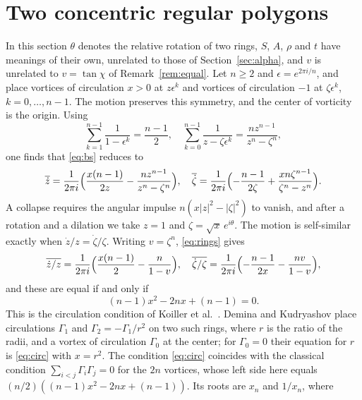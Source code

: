 \documentclass[11pt]{article}
\theoremstyle{definition}
\begin{document}
\section{Two concentric regular polygons}\label{sec:rings}

In this section $\theta$ denotes the relative rotation of two rings, $S$, $A$, $\rho$ and $t$ have meanings of their own, unrelated to those of Section~\ref{sec:alpha}, and $v$ is unrelated to $v = \tan\chi$ of Remark~\ref{rem:equal}. Let $n \ge 2$ and $\epsilon = e^{2\pi i/n}$, and place vortices of circulation $x > 0$ at $z\epsilon^k$ and vortices of circulation $-1$ at $\zeta\epsilon^k$, $k = 0, \dots, n - 1$. The motion preserves this symmetry, and the center of vorticity is the origin. Using
\[
  \sum_{k=1}^{n-1} \frac{1}{1 - \epsilon^k} = \frac{n - 1}{2}, \quad
  \sum_{k=0}^{n-1} \frac{1}{z - \zeta\epsilon^k} = \frac{n z^{n-1}}{z^n - \zeta^n},
\]
one finds that \eqref{eq:bs} reduces to \cite[Eq.~(3)]{aref1982}
\begin{equation}\label{eq:rings}
  \overline{\dot z} = \frac{1}{2\pi i}\Bigl(\frac{x(n - 1)}{2z} - \frac{n z^{n-1}}{z^n - \zeta^n}\Bigr), \quad
  \overline{\dot\zeta} = \frac{1}{2\pi i}\Bigl(-\frac{n - 1}{2\zeta} + \frac{x n \zeta^{n-1}}{\zeta^n - z^n}\Bigr).
\end{equation}
A collapse requires the angular impulse $n(x|z|^2 - |\zeta|^2)$ to vanish, and after a rotation and a dilation we take $z = 1$ and $\zeta = \sqrt{x}\, e^{i\theta}$. The motion is self-similar exactly when $\dot z/z = \dot\zeta/\zeta$. Writing $v = \zeta^n$, \eqref{eq:rings} gives
\[
  \overline{\dot z/z} = \frac{1}{2\pi i}\Bigl(\frac{x(n - 1)}{2} - \frac{n}{1 - v}\Bigr), \quad
  \overline{\dot\zeta/\zeta} = \frac{1}{2\pi i}\Bigl(-\frac{n - 1}{2x} - \frac{n v}{1 - v}\Bigr),
\]
and these are equal if and only if
\begin{equation}\label{eq:circ}
  (n - 1)x^2 - 2nx + (n - 1) = 0.
\end{equation}
This is the circulation condition of Koiller et al.\ \cite[Sect.~11]{koiller1985}. Demina and Kudryashov \cite[Sect.~3]{dk2014} place circulations $\Gamma_1$ and $\Gamma_2 = -\Gamma_1/r^2$ on two such rings, where $r$ is the ratio of the radii, and a vortex of circulation $\Gamma_0$ at the center; for $\Gamma_0 = 0$ their equation for $r$ \cite[Eq.~(37)]{dk2014} is \eqref{eq:circ} with $x = r^2$. The condition \eqref{eq:circ} coincides with the classical condition $\sum_{i<j} \Gamma_i \Gamma_j = 0$ for the $2n$ vortices, whose left side here equals $(n/2)((n - 1)x^2 - 2nx + (n - 1))$. Its roots are $x_n$ and $1/x_n$, where
\end{document}
